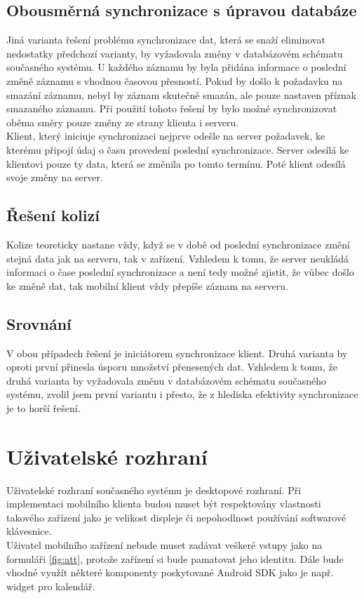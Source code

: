 \documentclass{diplomka}
\begin{document}
\subsection{Obousměrná synchronizace s úpravou databáze}
Jiná varianta řešení problému synchronizace dat, která se snaží eliminovat nedostatky předchozí varianty, by vyžadovala změny v databázovém schématu současného systému. U každého záznamu by byla přidána informace o poslední změně záznamu s vhodnou časovou přesností. Pokud by došlo k požadavku na smazání záznamu, nebyl by záznam skutečně smazán, ale pouze nastaven příznak smazaného záznamu. Při použití tohoto řešení by bylo možné synchronizovat oběma směry pouze změny ze strany klienta i serveru. \\ \indent
Klient, který iniciuje synchronizaci nejprve odešle na server požadavek, ke kterému připojí údaj o času provedení poslední synchronizace. Server odesílá ke klientovi pouze ty data, která se změnila po tomto termínu. Poté klient odesílá svoje změny na server.

\subsection{Řešení kolizí}
Kolize teoreticky nastane vždy, když se v době od poslední synchronizace změní stejná data jak na serveru, tak v zařízení. Vzhledem k tomu, že server neukládá informaci o čase poslední synchronizace a není tedy možné zjistit, že vůbec došlo ke změně dat, tak mobilní klient vždy přepíše záznam na serveru.

\subsection{Srovnání}
V obou případech řešení je iniciátorem synchronizace klient. Druhá varianta by oproti první přinesla úsporu množství přenesených dat. Vzhledem k tomu, že druhá varianta by vyžadovala změnu v databázovém schématu současného systému, zvolil jsem první variantu i přesto, že z hlediska efektivity synchronizace je to horší řešení.

\section{Uživatelské rozhraní}
Uživatelské rozhraní současného systému je desktopové rozhraní. Při implementaci mobilního klienta budou muset být respektovány vlastnosti takového zařízení jako je velikost displeje či nepohodlnost používání softwarové klávesnice.\\
\indent Uživatel mobilního zařízení nebude muset zadávat veškeré vstupy jako na formuláři \ref{fig:att}, protože zařízení si bude pamatovat jeho identitu. Dále bude vhodné využít některé komponenty poskytované Android SDK jako je např. widget pro kalendář.
\end{document}
